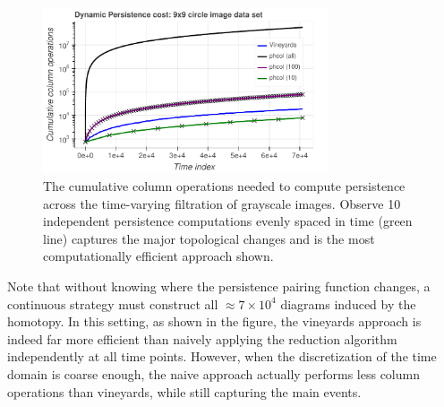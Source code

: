 \documentclass[sn-mathphys]{sn-jnl}
\begin{document}
\begin{figure}[!htb]
 	\centering
 	\includegraphics[width=0.75\textwidth]{circle_vineyards_vector.pdf}
 	\caption{The cumulative column operations needed to compute persistence across the time-varying filtration of grayscale images. Observe 10 independent persistence computations evenly spaced in time (green line) captures the major topological changes and is the most computationally efficient approach shown.}
 	\label{fig:vineyards}
 \end{figure}

Note that without knowing where the persistence pairing function changes, a continuous strategy must construct all $\approx 7 \times 10^{4}$ diagrams induced by the homotopy. 
In this setting, as shown in the figure, the vineyards approach is indeed far more efficient than naively applying the reduction algorithm independently at all time points.
However, when the discretization of the time domain is coarse enough, the naive approach actually performs less column operations than vineyards, while still capturing the main events. 
  
\end{document}
